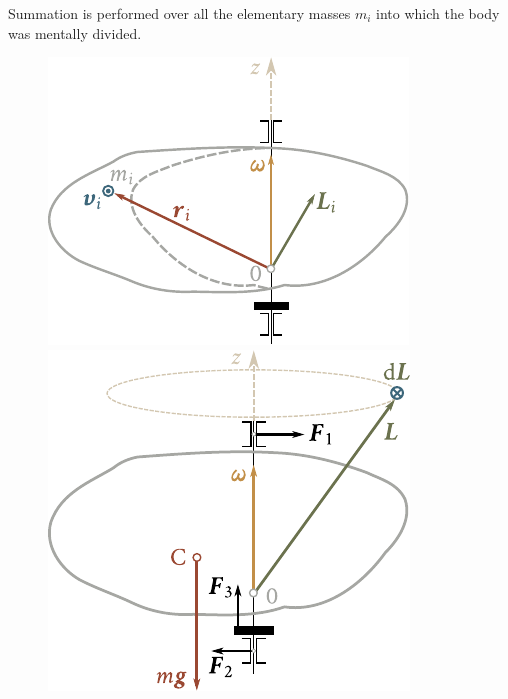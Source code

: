 \noindent
Summation is performed over all the elementary masses $m_i$ into which the body was mentally divided.

\begin{figure}[!htb]
	\begin{minipage}[t]{0.5\linewidth}
		\begin{center}
			\includegraphics[scale=0.95]{figures/ch_05/fig_5_6.pdf}
			\caption[]{}
			\label{fig:5_6}
		\end{center}
	\end{minipage}
	\hspace{-0.05cm}
	\begin{minipage}[t]{0.5\linewidth}
		\begin{center}
			\includegraphics[scale=0.95]{figures/ch_05/fig_5_7.pdf}
			\caption[]{}
			\label{fig:5_7}
		\end{center}
	\end{minipage}
\end{figure}

